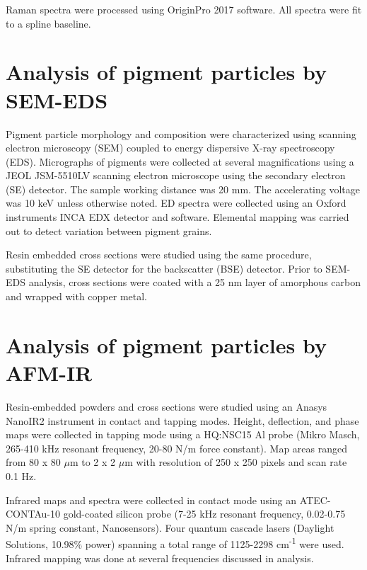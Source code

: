 Raman spectra were processed using OriginPro 2017 software. All spectra were fit to a spline baseline. 

\section[Analysis of pigment particles by SEM-EDS]{Analysis of pigment particles by SEM-EDS}
\label{section2.3}

Pigment particle morphology and composition were characterized using scanning electron microscopy (SEM) coupled to energy dispersive X-ray spectroscopy (EDS). Micrographs of pigments were collected at several magnifications using a JEOL JSM-5510LV scanning electron microscope using the secondary electron (SE) detector. The sample working distance was 20 mm. The accelerating voltage was 10 keV unless otherwise noted. ED spectra were collected using an Oxford instruments INCA EDX detector and software. Elemental mapping was carried out to detect variation between pigment grains.

Resin embedded cross sections were studied using the same procedure, substituting the SE detector for the backscatter (BSE) detector. Prior to SEM-EDS analysis, cross sections were coated with a 25 nm layer of amorphous carbon and wrapped with copper metal.

\section[Analysis of pigment particles by AFM-IR]{Analysis of pigment particles by AFM-IR}
\label{section2.4}

Resin-embedded powders and cross sections were studied using an Anasys NanoIR2 instrument in contact and tapping modes. Height, deflection, and phase maps were collected in tapping mode using a HQ:NSC15 Al probe (Mikro Masch, 265-410 kHz resonant frequency, 20-80 N/m force constant). Map areas ranged from 80 x 80 $\mu$m to 2 x 2 $\mu$m with resolution of 250 x 250 pixels and scan rate 0.1 Hz. 

Infrared maps and spectra were collected in contact mode using an ATEC-CONTAu-10 gold-coated silicon probe (7-25 kHz resonant frequency, 0.02-0.75 N/m spring constant, Nanosensors). Four quantum cascade lasers (Daylight Solutions, 10.98\% power) spanning a total range of 1125-2298 cm\textsuperscript{-1} were used. Infrared mapping was done at several frequencies discussed in analysis.


